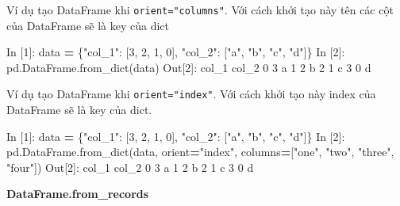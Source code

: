 \documentclass[
]{book}
\newenvironment{Shaded}{\begin{snugshade}}{\end{snugshade}}
\newcommand{\DecValTok}[1]{\textcolor[rgb]{0.00,0.00,0.81}{#1}}
\newcommand{\NormalTok}[1]{#1}
\newcommand{\OperatorTok}[1]{\textcolor[rgb]{0.81,0.36,0.00}{\textbf{#1}}}
\newcommand{\StringTok}[1]{\textcolor[rgb]{0.31,0.60,0.02}{#1}}
\begin{document}
Ví dụ tạo DataFrame khi \texttt{orient="columns"}. Với cách khởi tạo này tên các cột của DataFrame sẽ là key của dict

\begin{Shaded}
\begin{Highlighting}[]
\NormalTok{In [}\DecValTok{1}\NormalTok{]: data }\OperatorTok{=}\NormalTok{ \{}\StringTok{"col\_1"}\NormalTok{: [}\DecValTok{3}\NormalTok{, }\DecValTok{2}\NormalTok{, }\DecValTok{1}\NormalTok{, }\DecValTok{0}\NormalTok{], }\StringTok{"col\_2"}\NormalTok{: [}\StringTok{"a"}\NormalTok{, }\StringTok{"b"}\NormalTok{, }\StringTok{"c"}\NormalTok{, }\StringTok{"d"}\NormalTok{]\}}
\NormalTok{In [}\DecValTok{2}\NormalTok{]: pd.DataFrame.from\_dict(data)}
\NormalTok{Out[}\DecValTok{2}\NormalTok{]:}
\NormalTok{   col\_1 col\_2}
\DecValTok{0}      \DecValTok{3}\NormalTok{     a}
\DecValTok{1}      \DecValTok{2}\NormalTok{     b}
\DecValTok{2}      \DecValTok{1}\NormalTok{     c}
\DecValTok{3}      \DecValTok{0}\NormalTok{     d}
\end{Highlighting}
\end{Shaded}

Ví dụ tạo DataFrame khi \texttt{orient="index"}. Với cách khởi tạo này index của DataFrame sẽ là key của dict.

\begin{Shaded}
\begin{Highlighting}[]
\NormalTok{In [}\DecValTok{1}\NormalTok{]: data }\OperatorTok{=}\NormalTok{ \{}\StringTok{"col\_1"}\NormalTok{: [}\DecValTok{3}\NormalTok{, }\DecValTok{2}\NormalTok{, }\DecValTok{1}\NormalTok{, }\DecValTok{0}\NormalTok{], }\StringTok{"col\_2"}\NormalTok{: [}\StringTok{"a"}\NormalTok{, }\StringTok{"b"}\NormalTok{, }\StringTok{"c"}\NormalTok{, }\StringTok{"d"}\NormalTok{]\}}
\NormalTok{In [}\DecValTok{2}\NormalTok{]: pd.DataFrame.from\_dict(data, orient}\OperatorTok{=}\StringTok{"index"}\NormalTok{, }
\NormalTok{                               columns}\OperatorTok{=}\NormalTok{[}\StringTok{"one"}\NormalTok{, }\StringTok{"two"}\NormalTok{, }\StringTok{"three"}\NormalTok{, }\StringTok{"four"}\NormalTok{])}
\NormalTok{Out[}\DecValTok{2}\NormalTok{]:}
\NormalTok{   col\_1 col\_2}
\DecValTok{0}      \DecValTok{3}\NormalTok{     a}
\DecValTok{1}      \DecValTok{2}\NormalTok{     b}
\DecValTok{2}      \DecValTok{1}\NormalTok{     c}
\DecValTok{3}      \DecValTok{0}\NormalTok{     d}
\end{Highlighting}
\end{Shaded}

\textbf{DataFrame.from\_records}
\end{document}
